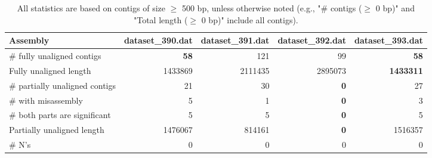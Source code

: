 \documentclass[12pt,a4paper]{article}
\begin{document}
\begin{table}[ht]
\begin{center}
\caption{All statistics are based on contigs of size $\geq$ 500 bp, unless otherwise noted (e.g., "\# contigs ($\geq$ 0 bp)" and "Total length ($\geq$ 0 bp)" include all contigs).}
\begin{tabular}{|l*{4}{|r}|}
\hline
Assembly & dataset\_390.dat & dataset\_391.dat & dataset\_392.dat & dataset\_393.dat \\ \hline
\# fully unaligned contigs & {\bf 58} & 121 & 99 & {\bf 58} \\ \hline
Fully unaligned length & 1433869 & 2111435 & 2895073 & {\bf 1433311} \\ \hline
\# partially unaligned contigs & 21 & 30 & {\bf 0} & 27 \\ \hline
\hspace{5mm}\# with misassembly & 5 & 1 & {\bf 0} & 3 \\ \hline
\hspace{5mm}\# both parts are significant & 5 & 5 & {\bf 0} & 5 \\ \hline
Partially unaligned length & 1476067 & 814161 & {\bf 0} & 1516357 \\ \hline
\# N's & 0 & 0 & 0 & 0 \\ \hline
\end{tabular}
\end{center}
\end{table}
\end{document}
